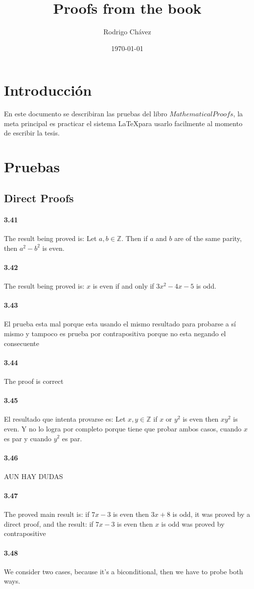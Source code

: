 \documentclass[11pt,a4paper]{article}
\title{Proofs from the book}
\date{\today}
\author{Rodrigo Chávez}
\newcommand{\Z}{\mathbb{Z}}
\begin{document}
\maketitle
\section{Introducción}
En este documento se describiran las pruebas del libro $Mathematical Proofs$, la meta principal es practicar el sistema \LaTeX para usarlo facilmente al momento de escribir la tesis.
\section{Pruebas}
\subsection{Direct Proofs}
\paragraph{3.41}
The result being proved is: Let $a, b \in \Z$. Then if $a$ and $b$ are of the same parity, then $a^2 - b^2$ is even.
\paragraph{3.42}
The result being proved is: $x$ is even if and only if $3x^2-4x-5$ is odd.
\paragraph{3.43}
El prueba esta mal porque esta usando el mismo resultado para probarse a sí mismo y tampoco es prueba por contrapositiva porque no esta negando el consecuente
\paragraph{3.44}
The proof is correct
\paragraph{3.45}
El resultado que intenta provarse es: Let $x, y \in \Z $ if $x$ or $y^2$ is even then $xy^2$ is even. Y no lo logra por completo porque tiene que probar ambos casos, cuando $x$ es par y cuando $y^2$ es par.
\paragraph{3.46}
AUN HAY DUDAS
\paragraph{3.47}
The proved main result is: if $7x -3$ is even then $3x + 8$ is odd, it was proved by a direct proof, and the result: if $7x - 3$ is even then $x$ is odd was proved by contrapositive
\paragraph{3.48}
We consider two cases, because it's a biconditional, then we have to probe both ways.
\end{document}
